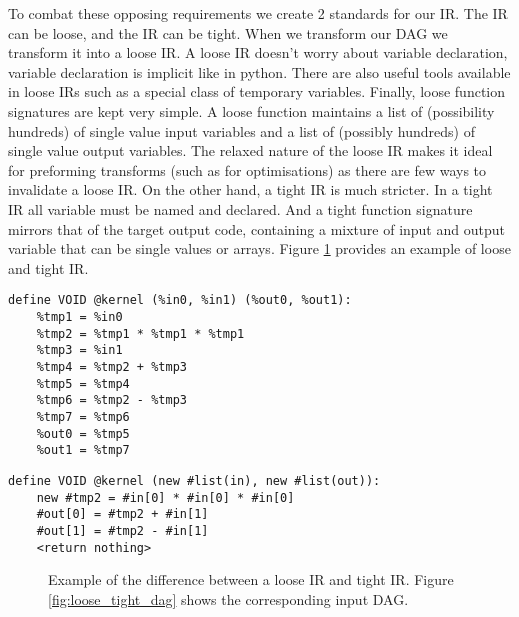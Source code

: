 To combat these opposing requirements we create 2 standards for our IR.
The IR can be loose, and the IR can be tight.
When we transform our DAG we transform it into a loose IR.
A loose IR doesn't worry about variable declaration, variable declaration is implicit like in python.
There are also useful tools available in loose IRs such as a special class of temporary variables.
Finally, loose function signatures are kept very simple.
A loose function maintains a list of (possibility hundreds) of single value input variables and a list of (possibly hundreds) of single value output variables.
The relaxed nature of the loose IR makes it ideal for preforming transforms (such as for optimisations) as there are few ways to invalidate a loose IR.
On the other hand, a tight IR is much stricter.
In a tight IR all variable must be named and declared.
And a tight function signature mirrors that of the target output code, containing a mixture of input and output variable that can be single values or arrays.
Figure \ref{fig:tight_loose} provides an example of loose and tight IR. 

\newsavebox{\looseIRlisting}
\begin{lrbox}{\looseIRlisting}%
\begin{lstlisting}
define VOID @kernel (%in0, %in1) (%out0, %out1):
	%tmp1 = %in0
	%tmp2 = %tmp1 * %tmp1 * %tmp1
	%tmp3 = %in1
	%tmp4 = %tmp2 + %tmp3
	%tmp5 = %tmp4
	%tmp6 = %tmp2 - %tmp3
	%tmp7 = %tmp6
	%out0 = %tmp5
	%out1 = %tmp7
\end{lstlisting}
\endminipage
\end{lrbox}

\newsavebox{\tightIRlisting}
\begin{lrbox}{\tightIRlisting}%
\begin{lstlisting}
define VOID @kernel (new #list(in), new #list(out)):
	new #tmp2 = #in[0] * #in[0] * #in[0]
	#out[0] = #tmp2 + #in[1]
	#out[1] = #tmp2 - #in[1]
	<return nothing>
\end{lstlisting}
\endminipage
\end{lrbox}

\begin{figure}
\centering


\usebox{\measurebox}\qquad
    \begin{minipage}[][\ht\measurebox][c]{.26\textwidth}
       
    \end{minipage}
\caption{Example of the difference between a loose IR and tight IR. Figure \ref{fig:loose_tight_dag} shows the corresponding input DAG. }
\label{fig:tight_loose}
\end{figure}


